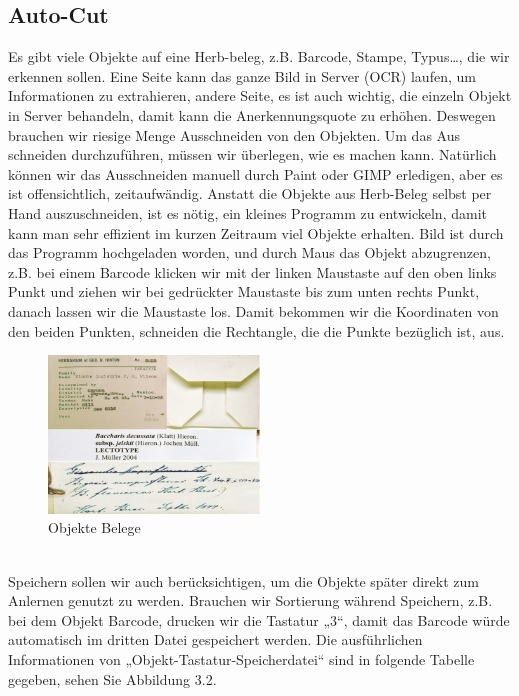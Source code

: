 \documentclass[10pt,a4paper]{report}
\begin{document}
\subsection{Auto-Cut}
Es gibt viele Objekte auf eine Herb-beleg, z.B. Barcode, Stampe, Typus…, die wir erkennen sollen. Eine Seite kann das ganze Bild in Server (OCR) laufen, um Informationen zu extrahieren, andere Seite, es ist auch wichtig, die einzeln Objekt in Server behandeln, damit kann die Anerkennungsquote zu erhöhen. Deswegen brauchen wir riesige Menge Ausschneiden von den Objekten.
Um das Aus schneiden durchzuführen, müssen wir überlegen, wie es machen kann. Natürlich können wir das Ausschneiden manuell durch Paint oder GIMP erledigen, aber es ist offensichtlich, zeitaufwändig. Anstatt die Objekte aus Herb-Beleg selbst per Hand auszuschneiden, ist es nötig, ein kleines Programm zu entwickeln, damit kann man sehr effizient im kurzen Zeitraum viel Objekte erhalten. 
Bild ist durch das Programm hochgeladen worden, und durch Maus das Objekt abzugrenzen, z.B. bei einem Barcode klicken wir mit der linken Maustaste auf den oben links Punkt und ziehen wir bei gedrückter Maustaste bis zum unten rechts Punkt, danach lassen wir die Maustaste los. Damit bekommen wir die Koordinaten von den beiden Punkten, schneiden die Rechtangle, die die Punkte bezüglich ist, aus.\\
\begin{figure}[htbp] 
	\centering
	\includegraphics[width=0.5\textwidth]{Cutobjekte.png}
	\caption{Objekte Belege}
	\label{fig:Bild 2}
\end{figure}\\
Speichern sollen wir auch berücksichtigen, um die Objekte später direkt zum Anlernen genutzt zu werden. Brauchen wir Sortierung während Speichern, z.B. bei dem Objekt Barcode, drucken wir die Tastatur „3“, damit das Barcode würde automatisch im dritten Datei gespeichert werden. Die ausführlichen Informationen von „Objekt-Tastatur-Speicherdatei“  sind in folgende Tabelle gegeben, sehen Sie Abbildung 3.2.\\
\end{document}
